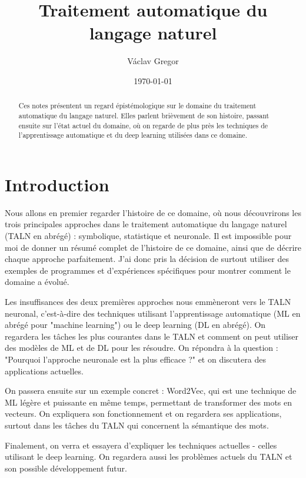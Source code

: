 \documentclass[11pt,a4paper]{report}
\title{Traitement automatique du langage naturel}
\author{Václav Gregor}
\date{\today}
\begin{document}
\maketitle
\tableofcontents


\begin{abstract}
  Ces notes présentent un regard épistémologique sur le domaine du traitement automatique du langage naturel. 
  Elles parlent brièvement de son histoire, passant ensuite sur l'état actuel du domaine, où on regarde de plus près 
  les techniques de l'apprentissage automatique et du deep learning utilisées dans ce domaine.
\end{abstract}


\chapter{Introduction}
  Nous allons en premier regarder l'histoire de ce domaine, où nous découvrirons
  les trois principales approches dans le traitement automatique du langage 
  naturel (TALN en abrégé) : symbolique, statistique et neuronale. 
  Il est impossible pour moi de donner un résumé complet de l'histoire de ce domaine, 
  ainsi que de décrire chaque approche parfaitement. J'ai donc pris la décision de surtout 
  utiliser des exemples de programmes et d'expériences spécifiques pour montrer 
  comment le domaine a évolué. 

  Les insuffisances des deux premières approches nous emmèneront vers le TALN neuronal, 
  c'est-à-dire des techniques utilisant l'apprentissage automatique (ML en abrégé pour "machine learning") ou 
  le deep learning (DL en abrégé). On regardera les tâches les plus courantes dans le TALN et comment 
  on peut utiliser des modèles de ML et de DL pour les résoudre. 
  On répondra à la question : "Pourquoi l'approche neuronale est la plus efficace ?" 
  et on discutera des applications actuelles. 
  
  On passera ensuite sur un exemple concret : Word2Vec, qui est une technique de ML légère et 
  puissante en même temps, permettant de transformer des mots en vecteurs. 
  On expliquera son fonctionnement et on regardera ses applications, surtout dans les tâches 
  du TALN qui concernent la sémantique des mots.

  Finalement, on verra et essayera d'expliquer les techniques actuelles - celles utilisant le deep learning.  
  On regardera aussi les problèmes actuels du TALN et son possible développement futur.  
  \cite{A-Brief-History-of-NLP}
  \cite{MUNI-NLP}
  \cite{NLP-Stanford-website}
  \cite{NLP-Wikipedia}
  \cite{QM-chatbots-and-no}
  \cite{QM-NN-learn-like-humans}
  \cite{QM-tiny-language-models}
\end{document}
